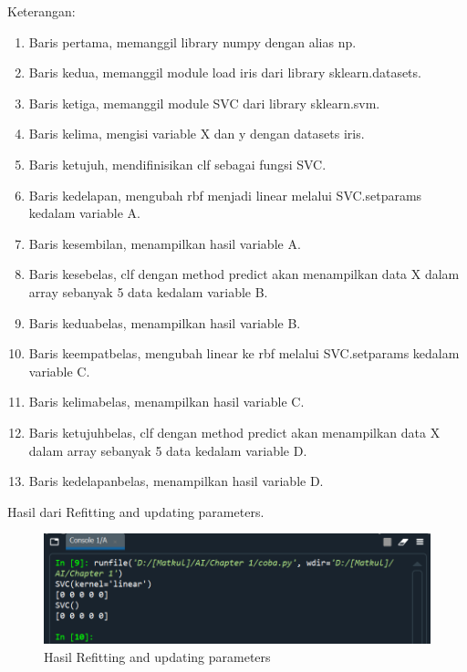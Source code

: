 \par Keterangan:
    \begin{enumerate}
        \item Baris pertama, memanggil library numpy dengan alias np.
        \item Baris kedua, memanggil module load iris dari library sklearn.datasets.
        \item Baris ketiga, memanggil module SVC dari library sklearn.svm.
        \item Baris kelima, mengisi variable X dan y dengan datasets iris.
        \item Baris ketujuh, mendifinisikan clf sebagai fungsi SVC.
        \item Baris kedelapan, mengubah rbf menjadi linear melalui SVC.setparams kedalam variable A.
        \item Baris kesembilan, menampilkan hasil variable A.
        \item Baris kesebelas, clf dengan method predict akan menampilkan data X dalam array sebanyak 5 data kedalam variable B.
        \item Baris keduabelas, menampilkan hasil variable B.
        \item Baris keempatbelas, mengubah linear ke rbf melalui SVC.setparams kedalam variable C.
        \item Baris kelimabelas, menampilkan hasil variable C.
        \item Baris ketujuhbelas, clf dengan method predict akan menampilkan data X dalam array sebanyak 5 data kedalam variable D.
        \item Baris kedelapanbelas, menampilkan hasil variable D.
    \end{enumerate}

\par Hasil dari Refitting and updating parameters.

    \begin{figure}[H]
    \centering
    \includegraphics[width=13cm]{figures/1184023/25.PNG}
    \caption{Hasil Refitting and updating parameters}
    \end{figure}

